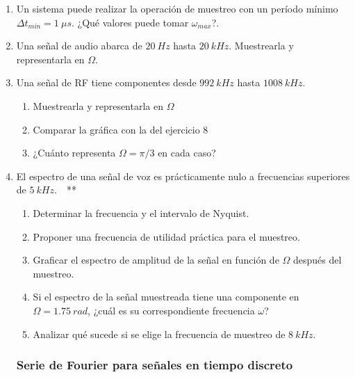 \documentclass[10pt,a4paper]{article}
\begin{document}
\begin{enumerate}
\item {Un sistema puede realizar la operación de muestreo con un período mínimo $\Delta t_{min}=1~\mu s$. ¿Qué valores 
puede tomar $\omega_{max}$?}.

\item {Una señal de audio abarca de $20~Hz$ hasta $20~kHz$. Muestrearla y representarla en $\Omega$.}

\item {Una señal de RF tiene componentes desde $992~kHz$ hasta $1008~kHz$}.
\begin{enumerate}
	\item Muestrearla y representarla en $\Omega$			
	\item Comparar la gráfica con la del ejercicio 8
	\item ¿Cuánto representa $\Omega=\pi/3$ en cada caso?			
\end{enumerate}	

\item {El espectro de una señal de voz es prácticamente nulo a frecuencias superiores de $5~kHz$.}~~**
\begin{enumerate}
	\item Determinar la frecuencia y el intervalo de Nyquist.		
	\item Proponer una frecuencia de utilidad práctica para el muestreo.
	\item Graficar el espectro de amplitud de la señal en función de $\Omega$ después del muestreo.
	\item Si el espectro de la señal muestreada tiene una componente en $\Omega=1.75~rad$, ¿cuál es su correspondiente 
	frecuencia $\omega$?
	\item Analizar qué sucede si se elige la frecuencia de muestreo de $8~kHz$.
\end{enumerate}	
	
\subsubsection*{Serie de Fourier para señales en tiempo discreto}


\end{enumerate}
\end{document}
